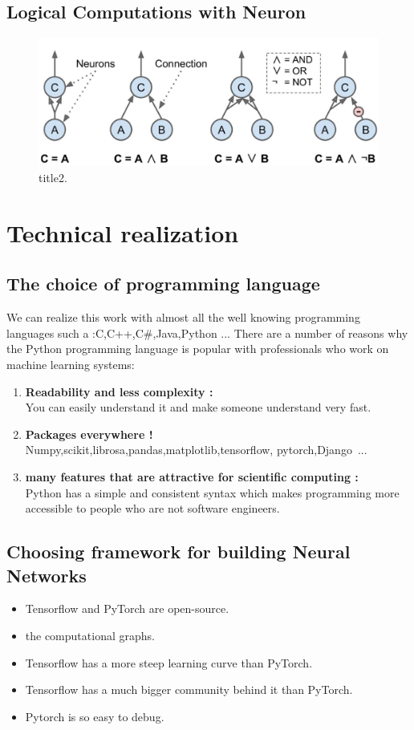 \documentclass[12pt]{report}
\begin{document}
		\section{Logical Computations with Neuron}
		\begin{figure}[h!]
			\centering
			\includegraphics[scale=1, width=15cm]{./images/LogicalComputationswithNeuron.jpg}
			\caption{title2.}	
		\end{figure}
		\FloatBarrier
		
\chapter{Technical realization}

	\section{The choice of programming language}
		We can realize this work with almost all the well knowing programming languages such a :C,C++,C#,Java,Python ...
		\newline
		There are a number of reasons why the Python programming language is popular with professionals who work on machine learning systems:
		\begin{enumerate}
			\item	\textbf{Readability and less complexity :}\\
			You can easily understand it and make someone understand very fast.
			\item	\textbf{Packages everywhere !}\\
			Numpy,scikit,librosa,pandas,matplotlib,tensorflow, pytorch,Django ...
			\item	\textbf{many features that are attractive for scientific computing :}\\
			Python has a simple and consistent syntax which makes programming more accessible to people who are not software engineers.
		\end{enumerate}	
	\section{Choosing framework for building Neural Networks}
		\begin{itemize}
			\item Tensorflow and PyTorch are open-source.
			\item the computational graphs.
			\item Tensorflow has a more steep learning curve than PyTorch.
			\item Tensorflow has a much bigger community behind it than PyTorch.
			\item Pytorch is so easy to debug.
	\end{itemize}
\end{document}
